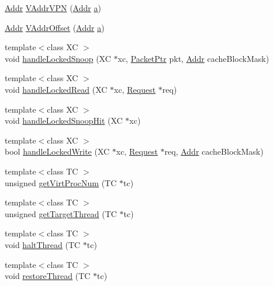 \begin{DoxyCompactItemize}
\item 
\hyperlink{classm5_1_1params_1_1Addr}{Addr} \hyperlink{namespaceMipsISA_a6a3762cb0de8ab43a6041339c5b38ba0}{VAddrVPN} (\hyperlink{classm5_1_1params_1_1Addr}{Addr} \hyperlink{namespaceMipsISA_ad15ace88a723e43c4e98c8c646891e79}{a})
\item 
\hyperlink{classm5_1_1params_1_1Addr}{Addr} \hyperlink{namespaceMipsISA_a2644e6b57b6479a8274c7c0c5b8bb8c3}{VAddrOffset} (\hyperlink{classm5_1_1params_1_1Addr}{Addr} \hyperlink{namespaceMipsISA_ad15ace88a723e43c4e98c8c646891e79}{a})
\item 
{\footnotesize template$<$class XC $>$ }\\void \hyperlink{namespaceMipsISA_a5f9bf68eab13cc8599dadd035bb3a45e}{handleLockedSnoop} (XC $\ast$xc, \hyperlink{classPacket}{PacketPtr} pkt, \hyperlink{classm5_1_1params_1_1Addr}{Addr} cacheBlockMask)
\item 
{\footnotesize template$<$class XC $>$ }\\void \hyperlink{namespaceMipsISA_aa7cc172c439c44fb54dc4c9ba7d90c3d}{handleLockedRead} (XC $\ast$xc, \hyperlink{classRequest}{Request} $\ast$req)
\item 
{\footnotesize template$<$class XC $>$ }\\void \hyperlink{namespaceMipsISA_a6212c59e93e2406923f9f1f3c6aabc9f}{handleLockedSnoopHit} (XC $\ast$xc)
\item 
{\footnotesize template$<$class XC $>$ }\\bool \hyperlink{namespaceMipsISA_afc30934f8d6d2afd2ff8f255ab6653ba}{handleLockedWrite} (XC $\ast$xc, \hyperlink{classRequest}{Request} $\ast$req, \hyperlink{classm5_1_1params_1_1Addr}{Addr} cacheBlockMask)
\item 
{\footnotesize template$<$class TC $>$ }\\unsigned \hyperlink{namespaceMipsISA_ace8d9fa5b5b0e0df218ba5a8b8f4f257}{getVirtProcNum} (TC $\ast$tc)
\item 
{\footnotesize template$<$class TC $>$ }\\unsigned \hyperlink{namespaceMipsISA_ab8a7664b76486386dbdb999b696f28a7}{getTargetThread} (TC $\ast$tc)
\item 
{\footnotesize template$<$class TC $>$ }\\void \hyperlink{namespaceMipsISA_ae1180cae39b870a32a413b188c7b4c55}{haltThread} (TC $\ast$tc)
\item 
{\footnotesize template$<$class TC $>$ }\\void \hyperlink{namespaceMipsISA_a0b64a2b72e9387f553f74f650a403bc9}{restoreThread} (TC $\ast$tc)

\end{DoxyCompactItemize}

